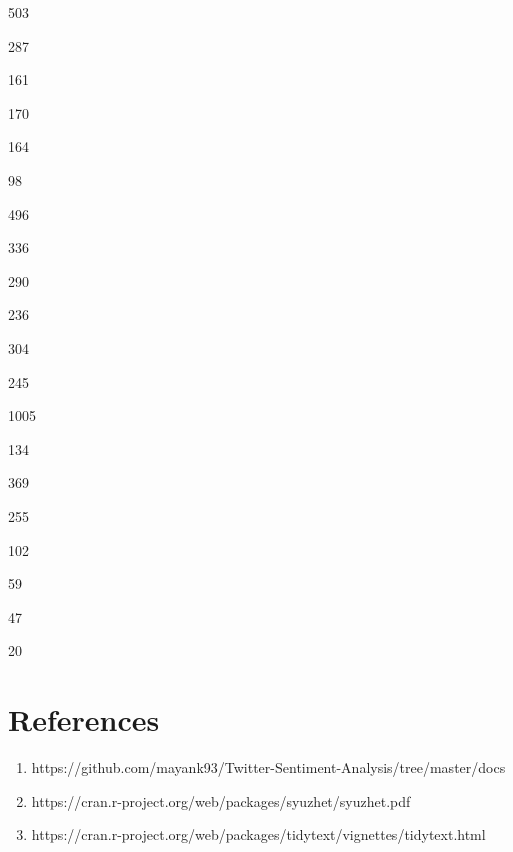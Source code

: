 \documentclass[a4paper,12pt]{book}
\theoremstyle{break}
\begin{document}
\begin{Schunk}
\begin{Soutput}
[1] 503
\end{Soutput}
\begin{Soutput}
[1] 287
\end{Soutput}
\begin{Soutput}
[1] 161
\end{Soutput}
\begin{Soutput}
[1] 170
\end{Soutput}
\begin{Soutput}
[1] 164
\end{Soutput}
\begin{Soutput}
[1] 98
\end{Soutput}
\begin{Soutput}
[1] 496
\end{Soutput}
\begin{Soutput}
[1] 336
\end{Soutput}
\begin{Soutput}
[1] 290
\end{Soutput}
\begin{Soutput}
[1] 236
\end{Soutput}
\begin{Soutput}
[1] 304
\end{Soutput}
\begin{Soutput}
[1] 245
\end{Soutput}
\begin{Soutput}
[1] 1005
\end{Soutput}
\begin{Soutput}
[1] 134
\end{Soutput}
\begin{Soutput}
[1] 369
\end{Soutput}
\begin{Soutput}
[1] 255
\end{Soutput}
\begin{Soutput}
[1] 102
\end{Soutput}
\begin{Soutput}
[1] 59
\end{Soutput}
\begin{Soutput}
[1] 47
\end{Soutput}
\begin{Soutput}
[1] 20
\end{Soutput}
\end{Schunk}

\section*{References}
\begin{enumerate}
\item https://github.com/mayank93/Twitter-Sentiment-Analysis/tree/master/docs
\item https://cran.r-project.org/web/packages/syuzhet/syuzhet.pdf
\item https://cran.r-project.org/web/packages/tidytext/vignettes/tidytext.html
\end{enumerate}
\end{document}
